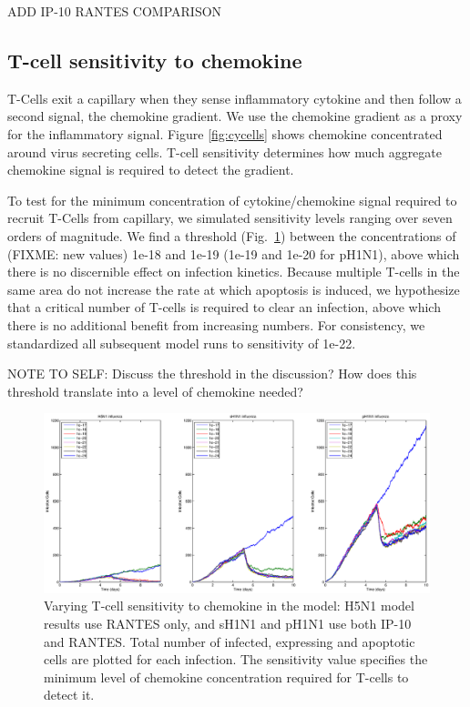 \documentclass[10pt]{article}
\begin{document}
ADD IP-10 RANTES COMPARISON

\subsection*{T-cell sensitivity to chemokine}

T-Cells exit a capillary when they sense inflammatory cytokine and then follow a second signal, the chemokine gradient.  We use the chemokine gradient as a proxy for the inflammatory signal.  Figure \ref{fig:cycells} shows chemokine concentrated around virus secreting cells.  
T-cell sensitivity determines how much aggregate chemokine signal is required to detect the gradient.

To test for the minimum concentration of cytokine/chemokine signal required to recruit T-Cells from capillary, we simulated sensitivity levels ranging over seven orders of magnitude. We find a threshold (Fig.~\ref{fig:sensitivity}) between the concentrations of (FIXME: new values) 1e-18 and 1e-19 (1e-19 and 1e-20 for pH1N1), above which there is no discernible effect on infection kinetics.  Because multiple T-cells in the same area do not increase the rate at which  apoptosis is induced, we hypothesize that a critical number of T-cells is required to clear an infection, above which there is no additional benefit from increasing numbers.  For consistency, we standardized all subsequent model runs to  sensitivity of 1e-22.


NOTE TO SELF: Discuss the threshold in the discussion?  How does this threshold translate into a level of chemokine needed?  

\begin{figure}[ht!]
\begin{center}
 \includegraphics[width=\textwidth]{sensitivity}
 \end{center}
\caption{Varying T-cell sensitivity to chemokine in the model: H5N1 model results use RANTES  only, and sH1N1 and pH1N1 use both IP-10 and RANTES. Total number of infected, expressing and apoptotic cells are plotted for each infection.  The sensitivity value specifies the minimum level of chemokine concentration required for T-cells to detect it. } 
 \label{fig:sensitivity}
\end{figure}
\end{document}

